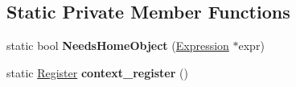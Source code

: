 \subsection*{Static Private Member Functions}
\begin{DoxyCompactItemize}
\item 
static bool {\bfseries Needs\+Home\+Object} (\hyperlink{classv8_1_1internal_1_1_expression}{Expression} $\ast$expr)\hypertarget{classv8_1_1internal_1_1_full_code_generator_a6b1f468862221d2ccffda05535ff7870}{}\label{classv8_1_1internal_1_1_full_code_generator_a6b1f468862221d2ccffda05535ff7870}

\item 
static \hyperlink{structv8_1_1internal_1_1_register}{Register} {\bfseries context\+\_\+register} ()\hypertarget{classv8_1_1internal_1_1_full_code_generator_a2086029c35aee2435b6124d602ea72c1}{}\label{classv8_1_1internal_1_1_full_code_generator_a2086029c35aee2435b6124d602ea72c1}

\end{DoxyCompactItemize}
